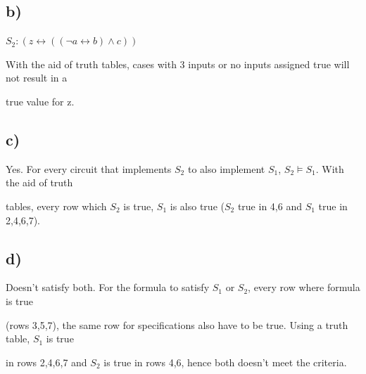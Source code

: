 \documentclass{article} %
\begin{document}
\subsection*{\hspace{1cm}b)}
\begin{flushleft}
\hspace{2cm}$S_2: (z \leftrightarrow ((\neg a \leftrightarrow b) \land  c))$

\hspace{2cm}With the aid of truth tables, cases with 3 inputs or no inputs assigned true will not result in a 

\hspace{2cm}true value for z.
\end{flushleft}

\subsection*{\hspace{1cm}c)}
\begin{flushleft}
\hspace{2cm}Yes. For every circuit that implements $S_2$ to also implement $S_1$, $S_2 \models S_1$. With the aid of truth 

\hspace{2cm}tables, every row which $S_2$ is true, $S_1$ is also true ($S_2$ true in 4,6 and $S_1$ true in 2,4,6,7).
\end{flushleft}

\subsection*{\hspace{1cm}d)}
\begin{flushleft}
\hspace{2cm}Doesn't satisfy both. For the formula to satisfy $S_1$ or $S_2$, every row where formula is true 

\hspace{2cm}(rows 3,5,7), the same row for specifications also have to be true. Using a truth table, $S_1$ is true 

\hspace{2cm}in rows 2,4,6,7 and $S_2$ is true in rows 4,6, hence both doesn't meet the criteria.

\end{flushleft}
\end{document}
